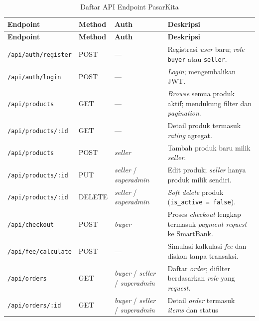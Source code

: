 \begin{longtable}{|L{4.5cm}|L{1.5cm}|L{3.5cm}|L{5cm}|}
    \caption{Daftar API Endpoint PasarKita}
    \label{tab:api-req} \\
    \hline
    \textbf{Endpoint} & \textbf{Method} & \textbf{Auth} & \textbf{Deskripsi} \\
    \hline
    \endfirsthead
    \hline
    \textbf{Endpoint} & \textbf{Method} & \textbf{Auth} & \textbf{Deskripsi} \\
    \hline
    \endhead
    \hline
    \endfoot
    \texttt{/api/auth/register}
        & POST & ---
        & Registrasi \textit{user} baru; \textit{role} \texttt{buyer} atau
          \texttt{seller}. \\
    \hline
    \texttt{/api/auth/login}
        & POST & ---
        & \textit{Login}; mengembalikan JWT. \\
    \hline
    \texttt{/api/products}
        & GET & ---
        & \textit{Browse} semua produk aktif; mendukung filter dan
          \textit{pagination}. \\
    \hline
    \texttt{/api/products/:id}
        & GET & ---
        & Detail produk termasuk \textit{rating} agregat. \\
    \hline
    \texttt{/api/products}
        & POST & \textit{seller}
        & Tambah produk baru milik \textit{seller}. \\
    \hline
    \texttt{/api/products/:id}
        & PUT & \textit{seller} / \textit{superadmin}
        & Edit produk; \textit{seller} hanya produk milik sendiri. \\
    \hline
    \texttt{/api/products/:id}
        & DELETE & \textit{seller} / \textit{superadmin}
        & \textit{Soft delete} produk (\texttt{is\_active = false}). \\
    \hline
    \texttt{/api/checkout}
        & POST & \textit{buyer}
        & Proses \textit{checkout} lengkap termasuk \textit{payment request} ke
          SmartBank. \\
    \hline
    \texttt{/api/fee/calculate}
        & POST & ---
        & Simulasi kalkulasi \textit{fee} dan diskon tanpa transaksi. \\
    \hline
    \texttt{/api/orders}
        & GET & \textit{buyer} / \textit{seller} / \textit{superadmin}
        & Daftar \textit{order}; difilter berdasarkan \textit{role} yang
          \textit{request}. \\
    \hline
    \texttt{/api/orders/:id}
        & GET & \textit{buyer} / \textit{seller} / \textit{superadmin}
        & Detail \textit{order} termasuk \textit{items} dan status

\end{longtable}
